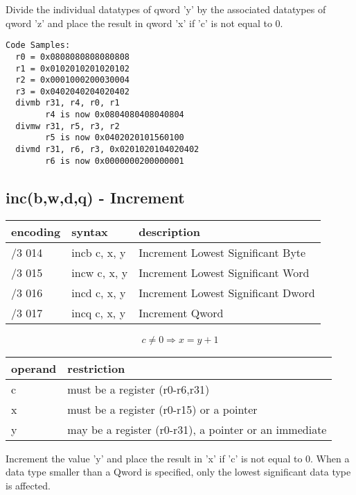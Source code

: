 \documentclass[letterpaper,10pt,openright,twoside,onecolumn]{book}
\begin{document}
  Divide the individual datatypes of qword 'y' by the associated datatypes of
  qword 'z' and place the result in qword 'x' if 'c' is not equal to 0.

  \begin{verbatim}
Code Samples:
  r0 = 0x0808080808080808
  r1 = 0x0102010201020102
  r2 = 0x0001000200030004
  r3 = 0x0402040204020402
  divmb r31, r4, r0, r1
        r4 is now 0x0804080408040804
  divmw r31, r5, r3, r2
        r5 is now 0x0402020101560100
  divmd r31, r6, r3, 0x0201020104020402
        r6 is now 0x0000000200000001
  \end{verbatim}
\newpage\subsection{inc(b,w,d,q) - Increment}
  \begin{tabular}{|l|l|l|}
   \hline
    encoding & syntax & description \\
   \hline
    /3 014 & incb c, x, y & Increment Lowest Significant Byte \\
    /3 015 & incw c, x, y & Increment Lowest Significant Word \\
    /3 016 & incd c, x, y & Increment Lowest Significant Dword \\
    /3 017 & incq c, x, y & Increment Qword \\
   \hline
  \end{tabular}

  \begin{displaymath} c \neq 0 \Rightarrow x = y + 1\end{displaymath}

  \flushleft
  \begin{tabular}{|l|l|}
   \hline
    operand & restriction \\
   \hline
    c & must be a register (r0-r6,r31) \\
    x & must be a register (r0-r15) or a pointer \\
    y & may be a register (r0-r31), a pointer or an immediate \\
   \hline
  \end{tabular}

  Increment the value 'y' and place the result in 'x' if 'c' is not
  equal to 0.
  When a data type smaller than a Qword is specified, only the
  lowest significant data type is affected.
\end{document}
